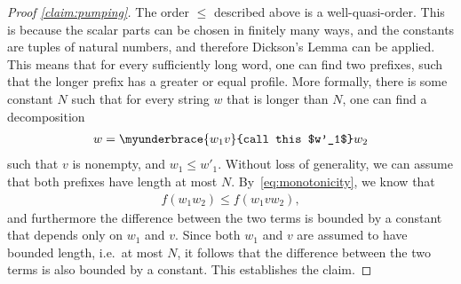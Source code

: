 \begin{proof}[Proof \cref{claim:pumping}]
    The order $\leq$ described above is a well-quasi-order. This is because the scalar parts can be chosen in finitely many ways, and the constants are tuples of natural numbers, and therefore Dickson's Lemma can be applied.  This means that for every sufficiently long word, one can find two prefixes, such that the longer prefix has a greater or equal profile. More formally,  there is some constant $N$ such that for every string $w$ that is longer than $N$, one can find a decomposition 
    \begin{align*}
     w =\myunderbrace{w_1 v}{call this $w'_1$} w_2
    \end{align*}
    such that $v$ is nonempty, and $w_1 \leq w'_1$. Without loss of generality, we can assume that both prefixes have length at most $N$. By~\eqref{eq:monotonicity}, we know that 
    \begin{align*}
    f(w_1w_2) \leq f(w_1vw_2),
    \end{align*}
    and furthermore the difference between the two terms is bounded by a constant that depends only on $w_1$ and $v$. Since both $w_1$ and $v$ are assumed to have bounded length, i.e.~at most $N$, it follows that the difference between the two terms is also bounded by a constant. This establishes the claim.
\end{proof}